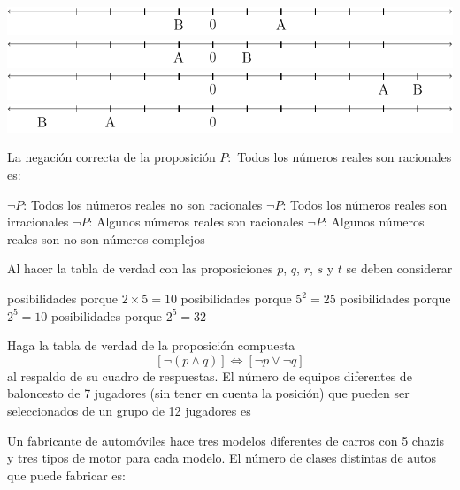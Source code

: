 \documentclass[10pt,letterpaper,addpoints]{exam}
\begin{document}
\begin{multicols}{2}
\begin{questions}
\begin{choices}
\CorrectChoice \includegraphics[scale=.5]{Images/respA.pdf} 
\choice \includegraphics[scale=.5]{Images/respB.pdf} 
\choice \includegraphics[scale=.5]{Images/respC.pdf} 
\choice \includegraphics[scale=.5]{Images/respD.pdf} 
  \end{choices}
  \question
  La negación correcta de la proposición $P:$ Todos los números reales son racionales es:
  \begin{choices}
  \choice $\neg P$: Todos los números reales no son racionales
  \choice $\neg P$: Todos los números reales son irracionales
  \CorrectChoice $\neg P$: Algunos números reales son racionales
  \choice $\neg P$: Algunos números reales son no son números complejos 
\end{choices}  
\question Al hacer la tabla de verdad con las proposiciones $p$, $q$, $r$, $s$ y $t$ se deben considerar
\begin{choices}
 posibilidades porque $2\times 5=10$
 posibilidades porque $5^{2}=25$
 posibilidades porque $2^{5}=10$
 posibilidades porque $2^{5}=32$
\end{choices}
\question Haga la tabla de verdad de la proposición compuesta 
\[[\neg(p\wedge q)]\Longleftrightarrow [\neg p \vee \neg q]\]
al respaldo de su cuadro de respuestas.
\question El número de equipos diferentes de baloncesto de 7 jugadores (sin tener en cuenta la posición) que pueden ser seleccionados de un grupo de 12 jugadores es

\begin{oneparchoices}
\end{oneparchoices}
\question Un fabricante de automóviles hace tres modelos diferentes de carros con 5 chazis y tres tipos de motor para cada modelo. El número de clases distintas de autos que puede fabricar es:


\end{questions}
\end{multicols}
\end{document}
